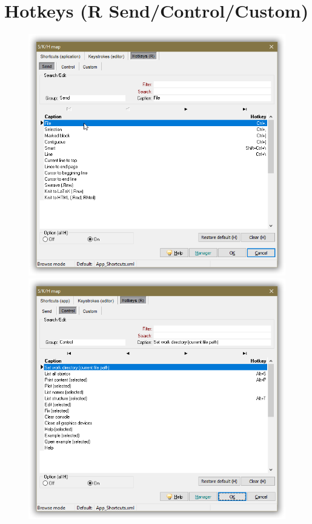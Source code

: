 
\hypertarget{working_hotkeys}{}
\section{Hotkeys (R Send/Control/Custom)}

\begin{figure}[H]
  \includegraphics[scale=0.36]{./res/skh_map_rh_send_dlg.png}
  \includegraphics[scale=0.36]{./res/skh_map_rh_control_dlg.png}

\end{figure}

